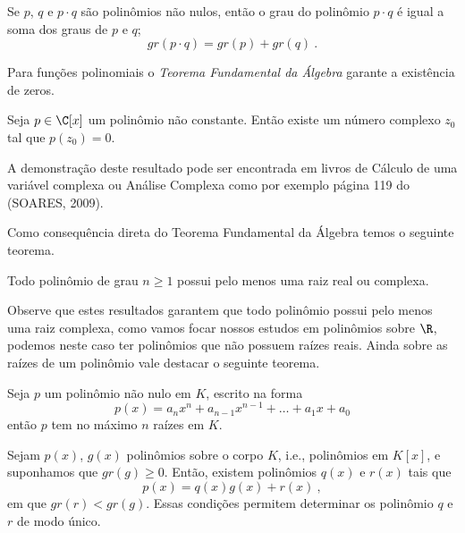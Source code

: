   \begin{teo}
  Se $p$, $q$ e $p \cdot q$ são polinômios não nulos, então o grau do polinômio $p \cdot q$ é igual a soma dos graus de $p$ e $q$;
\begin{equation}
gr(p \cdot q) = gr(p) + gr(q) \ .
\end{equation}
  \end{teo}

  Para funções polinomiais o \emph{Teorema Fundamental da Álgebra} garante a existência de zeros.

  \begin{teo}
  Seja $p \in \C[x]$ um polinômio não constante. Então existe um número complexo $z_0$ tal que $p(z_0)=0$.
  \end{teo}

  \begin{dem}
  A demonstração deste resultado pode ser encontrada em livros de Cálculo de uma variável complexa ou Análise Complexa como por exemplo página 119 do (SOARES, 2009).
  \end{dem}

  Como consequência direta do Teorema Fundamental da Álgebra temos o seguinte teorema.

  \begin{teo}
  Todo polinômio de grau $n \geq 1$ possui pelo menos uma raiz real ou complexa.
  \end{teo}

 Observe que estes resultados garantem que todo polinômio possui pelo menos uma raiz complexa, como vamos focar nossos estudos em polinômios sobre $\R$, podemos neste caso ter polinômios que não possuem raízes reais. Ainda sobre as raízes de um polinômio vale destacar o seguinte teorema.

 \begin{teo}
  Seja $p$ um polinômio não nulo em $K$, escrito na forma
\begin{equation}
p(x)= a_nx^n + a_{n-1}x^{n-1}+ \ldots + a_1x+ a_0
\end{equation}
   então $p$ tem no máximo $n$ raízes em $K$.
 \end{teo}

 \begin{teo}
  Sejam $p(x)$, $g(x)$ polinômios sobre o corpo $K$, i.e., polinômios em $K[x]$, e suponhamos que $gr(g) \geq 0$. Então, existem polinômios $q(x)$ e $r(x)$ tais que
\begin{equation}
p(x)= q(x)g(x) + r(x) \ , 
\end{equation}
  em que $gr(r) < gr (g)$. Essas condições permitem determinar os polinômio $q$ e $r$ de modo único.
 \end{teo}

